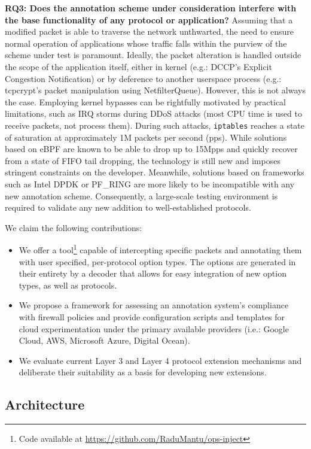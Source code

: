 \textbf{RQ3: Does the annotation scheme under consideration interfere with the base functionality of any protocol or application?}
Assuming that a modified packet is able to traverse the network unthwarted, the need to ensure normal operation of applications whose traffic falls within the purview of the scheme under test is paramount. Ideally, the packet alteration is handled outside the scope of the application itself, either in kernel (e.g.: DCCP's Explicit Congestion Notification) or by deference to another userspace process (e.g.: tcpcrypt's packet manipulation using NetfilterQueue). However, this is not always the case. Employing kernel bypasses can be rightfully motivated by practical limitations, such as IRQ storms during DDoS attacks (most CPU time is used to receive packets, not process them). During such attacks, \texttt{iptables} reaches a state of saturation at approximately 1M packets per second (pps). While solutions based on eBPF are known to be able to drop up to 15Mpps and quickly recover from a state of FIFO tail dropping, the technology is still new and imposes stringent constraints on the developer. Meanwhile, solutions based on frameworks such as Intel DPDK or PF\_RING are more likely to be incompatible with any new annotation scheme. Consequently, a large-scale testing environment is required to validate any new addition to well-established protocols.

We claim the following contributions:
\begin{itemize}
    \item We offer a tool\footnote{Code available at \url{https://github.com/RaduMantu/ops-inject}} capable of intercepting specific packets and annotating them with user specified, per-protocol option types. The options are generated in their entirety by a decoder that allows for easy integration of new option types, as well as protocols.
    \item We propose a framework for assessing an annotation system's compliance with firewall policies and provide configuration scripts and templates for cloud experimentation under the primary available providers (i.e.: Google Cloud, AWS, Microsoft Azure, Digital Ocean).
    \item We evaluate current Layer 3 and Layer 4 protocol extension mechanisms and deliberate their suitability as a basis for developing new extensions.
\end{itemize}

\subsection{Architecture}
\label{extend:ops:architecture}

